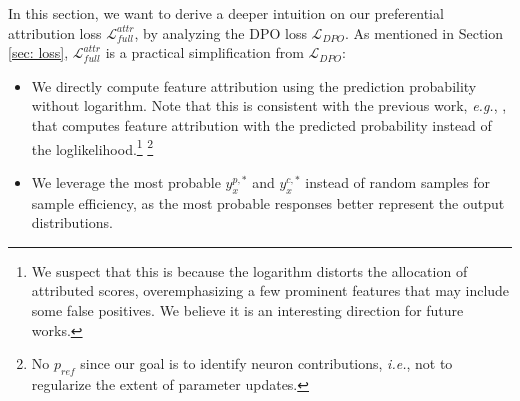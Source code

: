 \documentclass[11pt]{article}
\begin{document}
In this section, we want to derive a deeper intuition on our preferential attribution loss $\mathcal L^{attr}_{full}$, by analyzing the DPO loss $\mathcal L_{DPO}$. As mentioned in Section \ref{sec: loss}, $\mathcal L^{attr}_{full}$ is a practical simplification from $\mathcal L_{DPO}$:
\begin{itemize}
    \item We directly compute feature attribution using the prediction probability without logarithm. Note that this is consistent with the previous work, \emph{e.g.}, \citet{yang2023mitigating}, that computes feature attribution with the predicted probability instead of the loglikelihood.\footnote{We suspect that this is because the logarithm distorts the allocation of attributed scores, overemphasizing a few prominent features that may include some false positives. We believe it is an interesting direction for future works.} 
    \footnote{No $p_{ref}$ since our goal is to identify  neuron  contributions, \emph{i.e.}, not to regularize the extent of parameter updates. }


    \item We leverage the most probable $y^{p,*}_x$ and $y^{c,*}_x$ instead of random samples for sample efficiency,
    as the most probable responses better represent the output distributions. 
\end{itemize}
\end{document}
